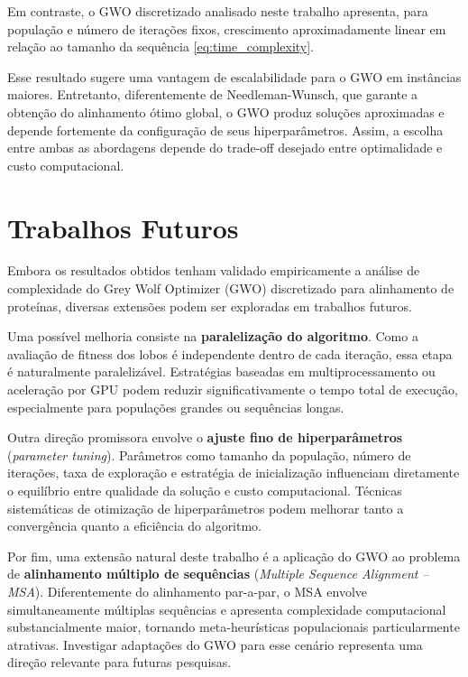 \documentclass[12pt]{article}
\begin{document}
Em contraste, o GWO discretizado analisado neste trabalho apresenta, para população e número de iterações fixos, crescimento aproximadamente linear em relação ao tamanho da sequência \eqref{eq:time_complexity}.

Esse resultado sugere uma vantagem de escalabilidade para o GWO em instâncias maiores. Entretanto, diferentemente de Needleman-Wunsch, que garante a obtenção do alinhamento ótimo global, o GWO produz soluções aproximadas e depende fortemente da configuração de seus hiperparâmetros. Assim, a escolha entre ambas as abordagens depende do trade-off desejado entre optimalidade e custo computacional.

\section{Trabalhos Futuros}

Embora os resultados obtidos tenham validado empiricamente a análise de complexidade do Grey Wolf Optimizer (GWO) discretizado para alinhamento de proteínas, diversas extensões podem ser exploradas em trabalhos futuros.

Uma possível melhoria consiste na \textbf{paralelização do algoritmo}. Como a avaliação de fitness dos lobos é independente dentro de cada iteração, essa etapa é naturalmente paralelizável. Estratégias baseadas em multiprocessamento ou aceleração por GPU podem reduzir significativamente o tempo total de execução, especialmente para populações grandes ou sequências longas.

Outra direção promissora envolve o \textbf{ajuste fino de hiperparâmetros} (\textit{parameter tuning}). Parâmetros como tamanho da população, número de iterações, taxa de exploração e estratégia de inicialização influenciam diretamente o equilíbrio entre qualidade da solução e custo computacional. Técnicas sistemáticas de otimização de hiperparâmetros podem melhorar tanto a convergência quanto a eficiência do algoritmo.

Por fim, uma extensão natural deste trabalho é a aplicação do GWO ao problema de \textbf{alinhamento múltiplo de sequências} (\textit{Multiple Sequence Alignment – MSA}). Diferentemente do alinhamento par-a-par, o MSA envolve simultaneamente múltiplas sequências e apresenta complexidade computacional substancialmente maior, tornando meta-heurísticas populacionais particularmente atrativas. Investigar adaptações do GWO para esse cenário representa uma direção relevante para futuras pesquisas.



\end{document}
